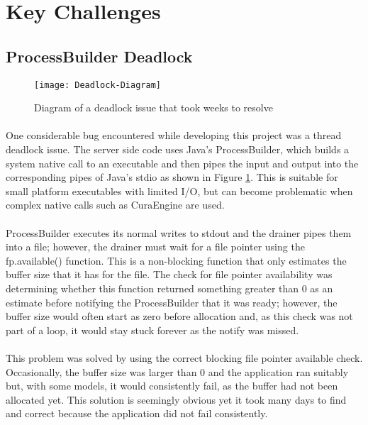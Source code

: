 
\section{Key Challenges}
\subsection{ProcessBuilder Deadlock}
\begin{figure}[!ht]
  \centering
  \texttt{[image: Deadlock-Diagram]}
  \caption{Diagram of a deadlock issue that took weeks to resolve}
  \label{fig:deadlock-diagram}
\end{figure}
\paragraph{}
One considerable bug encountered while developing this project was a thread deadlock issue. 
The server side code uses Java's ProcessBuilder, which builds a system native call to an executable and then pipes the input and output into the corresponding pipes of Java's stdio as shown in Figure \ref{fig:deadlock-diagram}.
This is suitable for small platform executables with limited I/O, but can become problematic when complex native calls such as CuraEngine are used.

\paragraph{}
ProcessBuilder executes its normal writes to stdout and the drainer pipes them into a file; however, the drainer must wait for a file pointer using the fp.available() function. 
This is a non-blocking function that only estimates the buffer size that it has for the file. 
The check for file pointer availability was determining whether this function returned something greater than 0 as an estimate before notifying the ProcessBuilder that it was ready;
however, the buffer size would often start as zero before allocation and, as this check was not part of a loop, it would stay stuck forever as the notify was missed.

\paragraph{}
This problem was solved by using the correct blocking file pointer available check. 
Occasionally, the buffer size was larger than 0 and the application ran suitably but, with some models, it would consistently fail, as the buffer had not been allocated yet.
This solution is seemingly obvious yet it took many days to find and correct because the application did not fail consistently.

